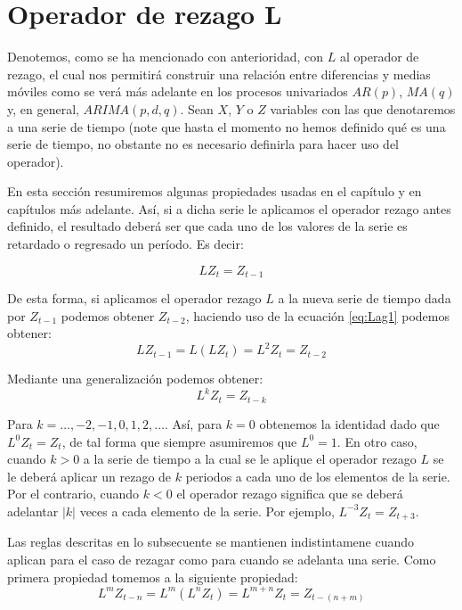 \documentclass[
]{book}
\begin{document}
\hypertarget{operador-de-rezago-l}{%
\section{Operador de rezago L}\label{operador-de-rezago-l}}

Denotemos, como se ha mencionado con anterioridad, con \(L\) al operador de rezago, el cual nos permitirá construir una relación entre diferencias y medias móviles como se verá más adelante en los procesos univariados \(AR(p)\), \(MA(q)\) y, en general, \(ARIMA(p, d, q)\). Sean \(X\), \(Y\) o \(Z\) variables con las que denotaremos a una serie de tiempo (note que hasta el momento no hemos definido qué es una serie de tiempo, no obstante no es necesario definirla para hacer uso del operador).

En esta sección resumiremos algunas propiedades usadas en el capítulo y en capítulos más adelante. Así, si a dicha serie le aplicamos el operador rezago antes definido, el resultado deberá ser que cada uno de los valores de la serie es retardado o regresado un período. Es decir:

\begin{equation}
    L Z_t = Z_{t-1}
    \label{eq:Lag1}
\end{equation}

De esta forma, si aplicamos el operador rezago \(L\) a la nueva serie de tiempo dada por \(Z_{t-1}\) podemos obtener \(Z_{t-2}\), haciendo uso de la ecuación \eqref{eq:Lag1} podemos obtener:
\begin{equation}
    L Z_{t-1} = L(L Z_t) = L^2 Z_t = Z_{t-2}
    \label{eq:Lag2}
\end{equation}

Mediante una generalización podemos obtener:
\begin{equation}
    L^k Z_t = Z_{t-k}
    \label{eq:Lag3}
\end{equation}

Para \(k = \ldots, -2, -1, 0, 1, 2, \ldots\). Así, para \(k = 0\) obtenemos la identidad dado que \(L^0 Z_t = Z_t\), de tal forma que siempre asumiremos que \(L^0 = 1\). En otro caso, cuando \(k > 0\) a la serie de tiempo a la cual se le aplique el operador rezago \(L\) se le deberá aplicar un rezago de \(k\) periodos a cada uno de los elementos de la serie. Por el contrario, cuando \(k < 0\) el operador rezago significa que se deberá adelantar \(|k|\) veces a cada elemento de la serie. Por ejemplo, \(L^{-3} Z_t = Z_{t+3}\).

Las reglas descritas en lo subsecuente se mantienen indistintamene cuando aplican para el caso de rezagar como para cuando se adelanta una serie. Como primera propiedad tomemos a la siguiente propiedad:
\begin{equation}
    L^{m} Z_{t-n} = L^{m} (L^{n} Z_{t}) = L^{m + n} Z_{t} = Z_{t-(n + m)} 
    \label{eq:Lag4}
\end{equation}
\end{document}
